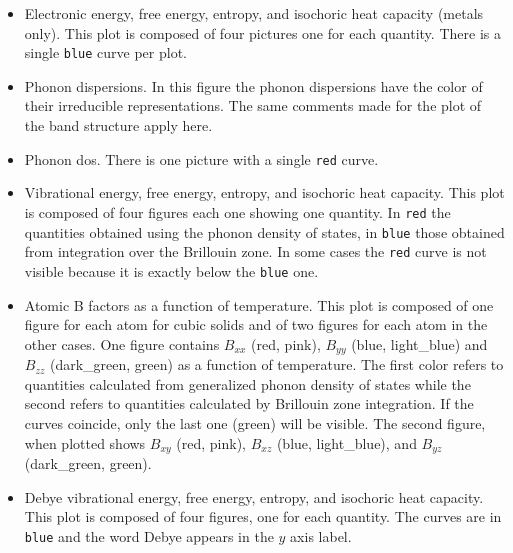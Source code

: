 \documentclass[12pt,a4paper]{article}
\begin{document}
\begin{itemize}
\item
Electronic energy, free energy, entropy, and isochoric heat capacity 
(metals only). This plot is composed of four pictures one for each
quantity. There is a single \texttt{blue} curve per plot.      

\item
Phonon dispersions. In this figure the phonon dispersions have the color 
of their irreducible representations. The same comments made for the plot of 
the band structure apply here.                       

\item
Phonon dos. There is one picture with a single \texttt{red} curve.  
   
\item
Vibrational energy, free energy, entropy, and isochoric heat capacity. This plot
is composed of four figures each one showing one quantity. In \texttt{red} the 
quantities obtained using the phonon density of states, 
in \texttt{blue} those obtained from integration over 
the Brillouin zone. In some cases the \texttt{red} curve is not visible 
because it is exactly below the \texttt{blue} one.

\item
Atomic B factors as a function of temperature. This plot is composed of 
one figure for each atom for cubic solids and of two figures for each atom
in the other cases. One figure contains $B_{xx}$ (red, pink), $B_{yy}$ 
(blue, light\_blue) and $B_{zz}$ (dark\_green, green) as a function of 
temperature. The first color refers to quantities calculated from 
generalized phonon density of states while the second refers to quantities 
calculated by Brillouin zone integration.
If the curves coincide, only the last one (green) will be visible. The second 
figure, when plotted shows $B_{xy}$ (red, pink), $B_{xz}$ (blue, light\_blue), 
and $B_{yz}$ (dark\_green, green).

\item
Debye vibrational energy, free energy, 
entropy, and isochoric heat capacity. This plot is composed of four 
figures, one for each quantity. The curves are in \texttt{blue}
and the word Debye appears in the $y$ axis label.
                                            

\end{itemize}
\end{document}
